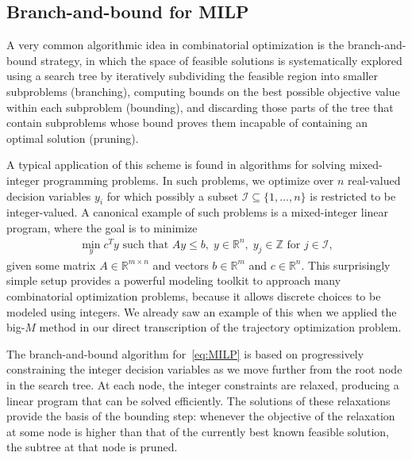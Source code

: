 \documentclass[a4paper]{report}
\theoremstyle{definition}
\theoremstyle{plain}
\begin{document}
\subsection{Branch-and-bound for MILP}\label{sec:branch-and-bound}


A very common algorithmic idea in combinatorial optimization is the
branch-and-bound strategy, in which the space of feasible solutions is
systematically explored using a search tree by iteratively subdividing the
feasible region into smaller subproblems (branching), computing bounds on the
best possible objective value within each subproblem (bounding), and discarding
those parts of the tree that contain subproblems whose bound proves them
incapable of containing an optimal solution (pruning).

A typical application of this scheme is found in algorithms for solving
mixed-integer programming problems.
%
In such problems, we optimize over $n$ real-valued decision variables $y_{i}$
for which possibly a subset $\mathcal{I} \subseteq \{1, \dots, n\}$ is
restricted to be integer-valued.
%
A canonical example of such problems is a mixed-integer linear program, where the
goal is to minimize
\begin{align}\label{eq:MILP}\tag{MILP}
  \min_{y} c^{T} y \text{ such that } Ay \leq b, \; y \in \mathbb{R}^{n}, \; y_{j} \in \mathbb{Z} \text{ for } j \in \mathcal{I},
\end{align}
given some matrix $A \in \mathbb{R}^{m\times n}$ and vectors
$b \in \mathbb{R}^{m}$ and $c \in \mathbb{R}^{n}$.
%
This surprisingly simple setup provides a powerful modeling toolkit to approach
many combinatorial optimization problems, because it allows discrete choices to
be modeled using integers.
%
We already saw an example of this when we applied the big-$M$ method in our
direct transcription of the trajectory optimization problem.

The branch-and-bound algorithm for~\eqref{eq:MILP} is based on progressively
constraining the integer decision variables as we move further from the root
node in the search tree.
%
At each node, the integer constraints are relaxed, producing a linear program
that can be solved efficiently.
%
The solutions of these relaxations provide the basis of the bounding step:
whenever the objective of the relaxation at some node is higher than that of the
currently best known feasible solution, the subtree at that node is pruned.
\end{document}
